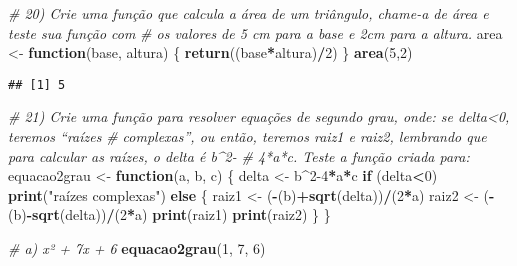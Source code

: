 \documentclass[]{article}
\newenvironment{Shaded}{\begin{snugshade}}{\end{snugshade}}
\newcommand{\CommentTok}[1]{\textcolor[rgb]{0.56,0.35,0.01}{\textit{#1}}}
\newcommand{\ControlFlowTok}[1]{\textcolor[rgb]{0.13,0.29,0.53}{\textbf{#1}}}
\newcommand{\DecValTok}[1]{\textcolor[rgb]{0.00,0.00,0.81}{#1}}
\newcommand{\KeywordTok}[1]{\textcolor[rgb]{0.13,0.29,0.53}{\textbf{#1}}}
\newcommand{\NormalTok}[1]{#1}
\newcommand{\OperatorTok}[1]{\textcolor[rgb]{0.81,0.36,0.00}{\textbf{#1}}}
\newcommand{\StringTok}[1]{\textcolor[rgb]{0.31,0.60,0.02}{#1}}
\begin{document}
\begin{Shaded}
\begin{Highlighting}[]
\CommentTok{# 20) Crie uma função que calcula a área de um triângulo, chame-a de área e teste sua função com}
\CommentTok{# os valores de 5 cm para a base e 2cm para a altura.}
\NormalTok{area <-}\StringTok{ }\ControlFlowTok{function}\NormalTok{(base, altura)}
\NormalTok{\{}
  \KeywordTok{return}\NormalTok{((base}\OperatorTok{*}\NormalTok{altura)}\OperatorTok{/}\DecValTok{2}\NormalTok{)}
\NormalTok{\}}
\KeywordTok{area}\NormalTok{(}\DecValTok{5}\NormalTok{,}\DecValTok{2}\NormalTok{)}
\end{Highlighting}
\end{Shaded}

\begin{verbatim}
## [1] 5
\end{verbatim}

\begin{Shaded}
\begin{Highlighting}[]
\CommentTok{# 21) Crie uma função para resolver equações de segundo grau, onde: se delta<0, teremos “raízes}
\CommentTok{# complexas”, ou então, teremos raiz1 e raiz2, lembrando que para calcular as raízes, o delta é b^2-}
\CommentTok{#   4*a*c. Teste a função criada para:}
\NormalTok{equacao2grau <-}\StringTok{ }\ControlFlowTok{function}\NormalTok{(a, b, c)}
\NormalTok{\{}
\NormalTok{  delta <-}\StringTok{ }\NormalTok{b}\OperatorTok{^}\DecValTok{2-4}\OperatorTok{*}\NormalTok{a}\OperatorTok{*}\NormalTok{c}
  \ControlFlowTok{if}\NormalTok{ (delta}\OperatorTok{<}\DecValTok{0}\NormalTok{)}
    \KeywordTok{print}\NormalTok{(}\StringTok{"raízes complexas"}\NormalTok{)}
  \ControlFlowTok{else}\NormalTok{ \{}
\NormalTok{    raiz1 <-}\StringTok{ }\NormalTok{(}\OperatorTok{-}\NormalTok{(b)}\OperatorTok{+}\KeywordTok{sqrt}\NormalTok{(delta))}\OperatorTok{/}\NormalTok{(}\DecValTok{2}\OperatorTok{*}\NormalTok{a)}
\NormalTok{    raiz2 <-}\StringTok{ }\NormalTok{(}\OperatorTok{-}\NormalTok{(b)}\OperatorTok{-}\KeywordTok{sqrt}\NormalTok{(delta))}\OperatorTok{/}\NormalTok{(}\DecValTok{2}\OperatorTok{*}\NormalTok{a)}
    \KeywordTok{print}\NormalTok{(raiz1)}
    \KeywordTok{print}\NormalTok{(raiz2)}
\NormalTok{  \}}
\NormalTok{\}}

\CommentTok{# a) x² + 7x + 6}
\KeywordTok{equacao2grau}\NormalTok{(}\DecValTok{1}\NormalTok{, }\DecValTok{7}\NormalTok{, }\DecValTok{6}\NormalTok{)}
\end{Highlighting}
\end{Shaded}
\end{document}
